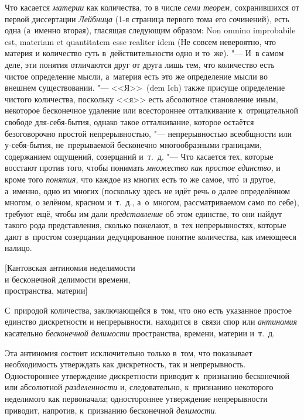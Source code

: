 Что касается {\em материи} как количества, то в числе {\em семи теорем,}
сохранившихся от первой диссертации {\em Лейбница} (1-я страница первого тома его сочинений), есть одна
(а~именно вторая), гласящая следующим образом: Non omnino impro\-babi\-le est,
mate\-riam et quanti\-tatem esse reali\-ter idem (Не совсем невероятно, что
материя и количество суть в~действительности одно и то~же). "--- И~в самом
деле, эти понятия отличаются друг от друга лишь тем, что количество есть
чистое определение мысли, а~материя есть это же определение мысли во внешнем
существовании. "--- <<Я>>~(dem Ich) также присуще определение чистого
количества, поскольку <<я>> есть абсолютное становление иным, некоторое
бесконечное удаление или всестороннее отталкивание к~отрицательной свободе
для-себя-бытия, однако такое отталкивание, которое остаётся безоговорочно
простой непрерывностью, "--- непрерывностью всеобщности или у-себя-бытия,
не~прерываемой бесконечно многообразными границами, содержанием ощущений,
созерцаний и~т.~д. "--- Что касается тех, которые восстают против того, чтобы
понимать {\em множество как простое единство,} и кроме того {\em понятия,} что
каждое из многих есть то же самое, чт\'{о}~и другое, а~именно, одно из многих
(поскольку здесь не идёт речь о далее определённом многом, о зелёном, красном
и~т.~д., а~о~многом, рассматриваемом само по себе), требуют ещё, чтобы им дали
{\em представление} об этом единстве, то они найдут такого рода представления,
сколько пожелают, в~тех непрерывностях, которые дают в~простом созерцании
дедуцированное понятие количества, как имеющееся налицо.

%
{[Кантовская антиномия неделимости\\и бесконечной делимости времени,\\
пространства, материи]}

\label{bkm:bm88a}С~природой количества, заключающейся в~том, что оно есть
указанное простое единство дискретности и непрерывности, находится в~связи спор
или {\em антиномия} касательно {\em бесконечной делимости} пространства,
времени, материи и~т.~д.

Эта антиномия состоит исключительно только в~том, что показывает необходимость
утверждать как дискретность, так и непрерывность. Одностороннее утверждение
дискретности приводит к~признанию бесконечной или абсолютной
{\em разделенности} и, следовательно, к~признанию некоторого неделимого как
первоначала; одностороннее утверждение непрерывности приводит, напротив,
к~признанию бесконечной {\em делимости}.

